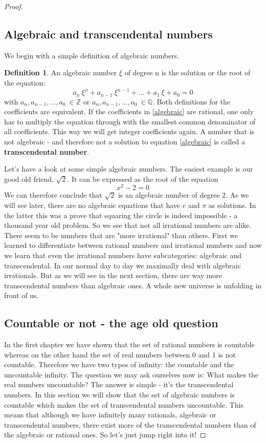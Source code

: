 \documentclass{article}
\theoremstyle{definition}
\newtheorem{definition}{Definition}[section]
\begin{document}
\begin{proof}
\subsection{Algebraic and transcendental numbers}

We begin with a simple definition of algebraic numbers.

\begin{definition} 
An algebraic number $\xi$ of degree n is the solution or the root of the equation:
\begin{equation}
\label{algebraic}
    a_n \: \xi^n + a_{n-1} \: \xi^{n-1}+...+ a_1 \: \xi + a_0 = 0
\end{equation}
with $a_n,a_{n-1},...,a_0 \: \in \mathbb{Z} $ or $a_n,a_{n-1},...,a_0 \: \in \mathbb{Q} $. Both definitions for the coefficients are equivalent. If the coefficients in \ref{algebraic} are rational, one only has to multiply the equation through with the smallest common denominator of all coefficients. This way we will get integer coefficients again. A number that is not algebraic - and therefore not a solution to equation \ref{algebraic} is called a \textbf{transcendental number}. 
\end{definition}
Let's have a look at some simple algebraic numbers. The easiest example is our good old friend, $\sqrt{2}$. It can be expressed as the root of the equation
\begin{equation}
    x^2 - 2 = 0
\end{equation}
We can therefore conclude that $\sqrt{2}$ is an algebraic number of degree 2. As we will see later, there are no algebraic equations that have $e$ and $\pi$ as solutions. In the latter this was a prove that squaring the circle is indeed impossible - a thousand year old problem. So we see that not all irrational numbers are alike. There seem to be numbers that are "more irrational" than others. First we learned to differentiate between rational numbers and irrational numbers and now we learn that even the irrational numbers have subcategories: algebraic and transcendental. In our normal day to day we maximally deal with algebraic irrationals. But as we will see in the next section, there are way more transcendental numbers than algebraic ones. A whole new universe is unfolding in front of us. 


\subsection{Countable or not - the age old question}
In the first chapter we have shown that the set of rational numbers is countable whereas on the other hand the set of real numbers between 0 and 1 is not countable. Therefore we have two types of infinity: the countable and the uncountable infinity. The question we may ask ourselves now is: What makes the real numbers uncountable? The answer is simple - it's the transcendental numbers. In this section we will show that the set of algebraic numbers is countable which makes the set of transcendental numbers uncountable. This means that although we have infinitely many rationals, algebraic or transcendental numbers, there exist more of the transcendental numbers than of the algebraic or rational ones. So let's just jump right into it!


\end{proof}
\end{document}
